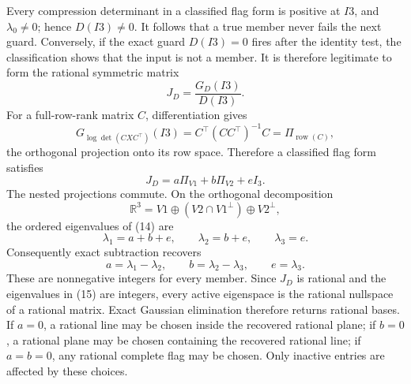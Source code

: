 Every compression determinant in a classified flag form is positive at
\(I3\), and \(\lambda_0\neq0\); hence \(D(I3)\neq0\).  It follows that
a true member never fails the next guard.  Conversely, if the exact
guard \(D(I3)=0\) fires after the identity test, the classification
shows that the input is not a member.  It is therefore legitimate to
form the rational symmetric matrix
\[
 J_D=\frac{G_D(I3)}{D(I3)}.
\]
For a full-row-rank matrix \(C\), differentiation gives
\[
 G_{\log\det(CXC^{\top})}(I3)
 =C^{\top}(CC^{\top})^{-1}C
 =\Pi_{\operatorname{row}(C)},                                      \tag{13}
\]
the orthogonal projection onto its row space.  Therefore a classified
flag form satisfies
\[
 J_D=a\Pi_{V1}+b\Pi_{V2}+eI_3.                                      \tag{14}
\]
The nested projections commute.  On the orthogonal decomposition
\[
 \mathbb R^3
 =V1\oplus(V2\cap V1^{\perp})\oplus V2^{\perp},
\]
the ordered eigenvalues of (14) are
\[
 \lambda_1=a+b+e,
 \qquad \lambda_2=b+e,
 \qquad \lambda_3=e.                                                \tag{15}
\]
Consequently exact subtraction recovers
\[
 a=\lambda_1-\lambda_2,
 \qquad b=\lambda_2-\lambda_3,
 \qquad e=\lambda_3.                                                \tag{16}
\]
These are nonnegative integers for every member.  Since \(J_D\) is
rational and the eigenvalues in (15) are integers, every active
eigenspace is the rational nullspace of a rational matrix.  Exact
Gaussian elimination therefore returns rational bases.  If \(a=0\), a
rational line may be chosen inside the recovered rational plane; if
\(b=0\), a rational plane may be chosen containing the recovered
rational line; if \(a=b=0\), any rational complete flag may be chosen.
Only inactive entries are affected by these choices.


